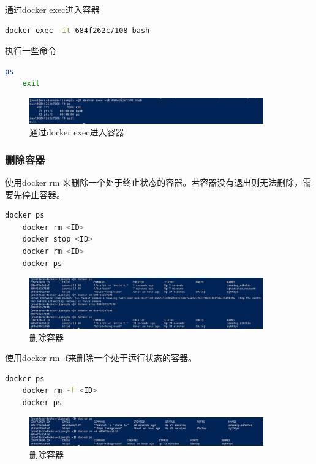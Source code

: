\documentclass{article}
\begin{document}
通过docker exec进入容器

\begin{lstlisting}[language=bash]
    docker exec -it 684f262c7108 bash
\end{lstlisting}

执行一些命令

\begin{lstlisting}[language=bash]
    ps
    exit
\end{lstlisting}

\begin{figure}[H]
\centering
\includegraphics[width=0.9\textwidth]{img/0.2.4.3.4.png}
\caption{通过docker exec进入容器}
\end{figure}

\subsubsection{删除容器}

使用docker rm 来删除一个处于终止状态的容器。若容器没有退出则无法删除，需要先停止容器。

\begin{lstlisting}[language=bash]
    docker ps
    docker rm <ID>
    docker stop <ID>
    docker rm <ID>
    docker ps
\end{lstlisting}

\begin{figure}[H]
\centering
\includegraphics[width=0.9\textwidth]{img/0.2.4.4.1.png}
\caption{删除容器}
\end{figure}

使用docker rm -f来删除一个处于运行状态的容器。

\begin{lstlisting}[language=bash]
    docker ps
    docker rm -f <ID>
    docker ps
\end{lstlisting}

\begin{figure}[H]
\centering
\includegraphics[width=0.9\textwidth]{img/0.2.4.4.2.png}
\caption{删除容器}
\end{figure}
\end{document}
